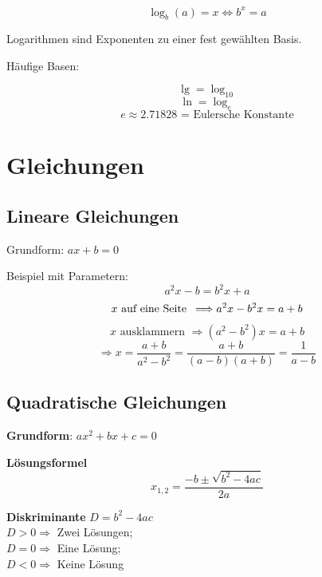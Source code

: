\begin{multicols}{2}
\begin{tcolorbox}[colback=white]
$$\log_b{}(a)=x \Longleftrightarrow{} b^x = a$$
\end{tcolorbox}

Logarithmen sind Exponenten zu einer fest gewählten Basis.

Häufige Basen:

$$\lg = \log_{10} $$
$$\ln = \log_e$$
$$e \approx 2.71828 \textrm{ = Eulersche Konstante}$$


\begin{tcolorbox}[colback=white]

\end{tcolorbox}%
%
\RLP{\forceCB{}}%
\keinHeaderUndKeinFooter{}

\section*{Gleichungen}

\subsection*{Lineare Gleichungen}
Grundform: $ax+b=0$

Beispiel mit Parametern:
$$a^2x-b=b^2x+a$$
$$x\textrm{ auf eine Seite\, } \Longrightarrow a^2x -b^2x = a+b$$
$$x\textrm{ ausklammern }\Longrightarrow (a^2-b^2)x= a+b$$
$$\Longrightarrow x= \frac{a+b}{a^2-b^2} = \frac{a+b}{(a-b)(a+b)}=\frac{1}{a-b}$$

\subsection*{Quadratische Gleichungen}

\textbf{Grundform}: $ax^2 + bx+c = 0$

\begin{tcolorbox}[colback=white]
  \textbf{Lösungsformel}
  $$x_{1,2} = \frac{-b \pm \sqrt{b^2-4ac}}{2a}$$
\end{tcolorbox}
\textbf{Diskriminante} $D = b^2-4ac$\\
$D>0\Longrightarrow$ Zwei Lösungen;\\
$D=0\Longrightarrow$ Eine Lösung;\\
$D<0\Longrightarrow$ Keine Lösung


\end{multicols}

